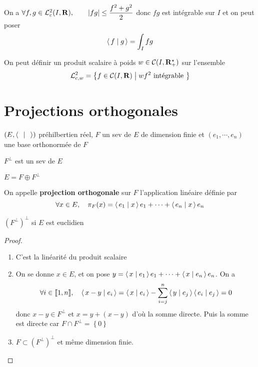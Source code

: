 On a $\forall  f,g \in  \mathcal  L_c^2(I, \mathbf R), \qquad  |fg|\leq \dfrac{f^2+g^2}{2}$ donc $fg$ est intégrable sur  $I$ et on peut poser  \[
\scalar{f}{g} =\int_Ifg
\] 

\begin{rem}
    On peut définir un produit scalaire à poids $w \in  \mathcal  C(I, \mathbf R_+^\star)$ sur l'ensemble \[ \mathcal  L_{c,w}^2= \left\{  f \in  \mathcal  C(I, \R) \suchthat wf^2 \text{ intégrable } \right\} \]
\end{rem}

\section{Projections orthogonales}

\begin{thmdef}
    \Hyp $(E, \scalar{\;}{\;} )$ préhilbertien réel, $F$ un sev de  $E$ de dimension finie et  $(e_1, \cdots , e_n)$ une base orthonormée de $F$
     \begin{concenum}
     \item $F^\perp$ est un sev de  $E$
     \item  $E=F\oplus F^\perp$
     \item  On appelle \textbf{projection orthogonale} sur $F$ l'application linéaire définie par  \[\forall  x \in  E, \quad  \pi_F(x)= \scalar{e_1}{x}e_1+\cdots +\scalar{e_n}{x} e_n \]
     \item $(F^\perp)^\perp$ si  $E$ est euclidien
    \end{concenum}
\end{thmdef}

\begin{proof}~
\begin{enumerate}
    \item C'est la linéarité du produit scalaire
    \item  On se donne $x \in E$, et on pose $y= \scalar{x}{e_1} e_1+\cdots +\scalar{x}{e_n} e_n$. On a \[
            \forall  i \in  \llbracket 1, n \rrbracket, \quad   \scalar{x-y}{e_i} = \scalar{x}{e_i} - \sum_{i=j}^n \scalar{y}{e_j} \scalar{e_i}{e_j} =0
    \] 
    donc $x-y \in  F^\perp$ et $x=y+(x-y)$ d'où la somme directe. Puis la somme est directe car  $F\cap F^\perp = \left\{  0 \right\} $ 
\item $F\subset (F^\perp)^\perp$ et même dimension finie.
\end{enumerate}
\end{proof}

